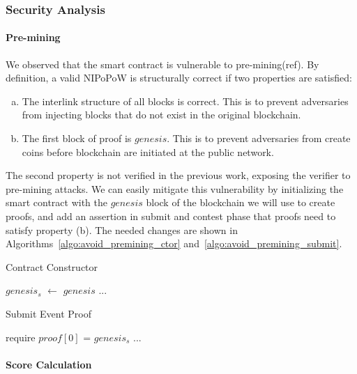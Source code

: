 

\subsubsection{Security Analysis}

\paragraph{Pre-mining} We observed that the smart contract is vulnerable to
pre-mining(ref). By definition, a valid NIPoPoW is structurally correct if two
properties are satisfied:

\begin{enumerate}[(a)]

\item The interlink structure of all blocks is correct. This is to prevent
    adversaries from injecting blocks that do not exist in the original
    blockchain.

\item The first block of proof is $genesis$. This is to prevent adversaries
    from create coins before blockchain are initiated at the public network.

\end{enumerate}

The second property is not verified in the previous work, exposing the verifier
to pre-mining attacks. We can easily mitigate this vulnerability by
initializing the smart contract with the $genesis$ block of the blockchain we
will use to create proofs, and add an assertion in submit and contest phase
that proofs need to satisfy property (b). The needed changes are shown in
Algorithms~\ref{algo:avoid_premining_ctor}
and~\ref{algo:avoid_premining_submit}.

\begin{algorithm}
    \caption{Contract Constructor}
    \label{algo:avoid_premining_ctor}
    $genesis_{s}$ $\leftarrow$ $genesis$\newline
    ...
\end{algorithm}
\vspace{-0.7cm}
\begin{algorithm}
    \caption{Submit Event Proof}
    \label{algo:avoid_premining_submit}
    require $proof[0]$ = $genesis_{s}$\newline
    ...
\end{algorithm}

\bigbreak
\paragraph{Score Calculation}

